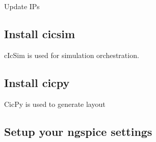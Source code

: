 Update IPs

\begin{Shaded}
\begin{Highlighting}[]
\end{Highlighting}
\end{Shaded}

\subsection{Install cicsim}\label{install-cicsim}

cIcSim is used for simulation orchestration.

\begin{Shaded}
\begin{Highlighting}[]
 
\end{Highlighting}
\end{Shaded}

\subsection{Install cicpy}\label{install-cicpy}

CicPy is used to generate layout

\begin{Shaded}
\begin{Highlighting}[]
 
 
\end{Highlighting}
\end{Shaded}

\subsection{Setup your ngspice
settings}\label{setup-your-ngspice-settings}

